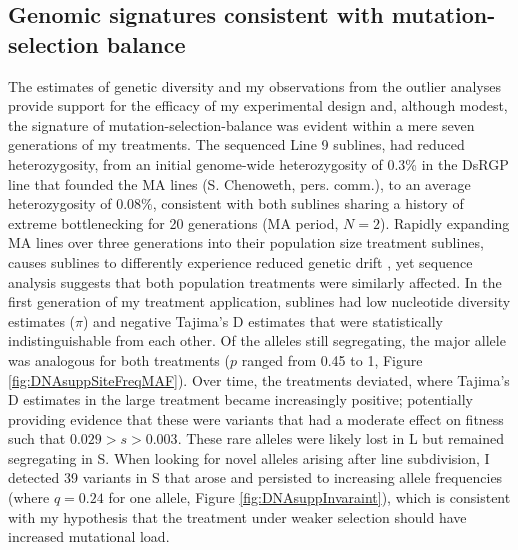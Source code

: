 \subsection{Genomic signatures consistent with mutation-selection balance}
The estimates of genetic diversity and my observations from the outlier analyses provide support for the efficacy of my experimental design and, although modest, the signature of mutation-selection-balance was evident within a mere seven generations of my treatments. The sequenced Line 9 sublines, had reduced heterozygosity, from an initial genome-wide heterozygosity of 0.3\% in the DsRGP line that founded the MA lines (S. Chenoweth, pers. comm.), to an average heterozygosity of 0.08\%, consistent with both sublines sharing a history of extreme bottlenecking for 20 generations (MA period, $N=2$). Rapidly expanding MA lines over three generations into their population size treatment sublines, causes sublines to differently experience reduced genetic drift \citep{Kimu63}, yet sequence analysis suggests that both population treatments were similarly affected. In the first generation of my treatment application, sublines had low nucleotide diversity estimates ($\pi$) and negative Tajima’s D estimates that were statistically indistinguishable from each other. Of the alleles still segregating, the major allele was analogous for both treatments ($p$ ranged from 0.45 to 1, Figure \ref{fig:DNAsuppSiteFreqMAF}). Over time, the treatments deviated, where Tajima’s D estimates in the large treatment became increasingly positive; potentially providing evidence that these were variants that had a moderate effect on fitness such that $0.029 > s > 0.003$. These rare alleles were likely lost in L but remained segregating in S. When looking for novel alleles arising after line subdivision, I detected 39 variants in S that arose and persisted to increasing allele frequencies (where $q = 0.24$ for one allele, Figure \ref{fig:DNAsuppInvaraint}), which is consistent with my hypothesis that the treatment under weaker selection should have increased mutational load.\par

